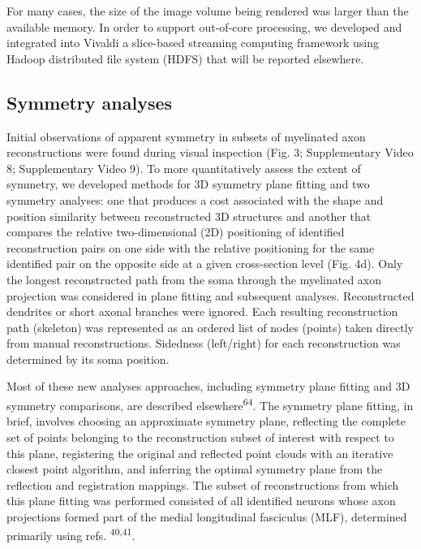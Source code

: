 \documentclass{article}
\begin{document}
For many cases, the size of the image volume being rendered was larger than the available memory. In order to support out-of-core processing, we developed and integrated into Vivaldi a slice-based streaming computing framework using Hadoop distributed file system (HDFS) that will be reported elsewhere.

\subsection*{Symmetry analyses}

Initial observations of apparent symmetry in subsets of myelinated axon reconstructions were found during visual inspection (Fig. 3; Supplementary Video 8; Supplementary Video 9). To more quantitatively assess the extent of symmetry, we developed methods for 3D symmetry plane fitting and two symmetry analyses: one that produces a cost associated with the shape and position similarity between reconstructed 3D structures and another that compares the relative two-dimensional (2D) positioning of identified reconstruction pairs on one side with the relative positioning for the same identified pair on the opposite side at a given cross-section level (Fig. 4d). Only the longest reconstructed path from the soma through the myelinated axon projection was considered in plane fitting and subsequent analyses. Reconstructed dendrites or short axonal
branches were ignored. Each resulting reconstruction path (skeleton) was represented as an ordered list of nodes (points) taken directly from manual reconstructions. Sidedness (left/right) for each reconstruction was determined by its soma position.

Most of these new analyses approaches, including symmetry plane fitting and 3D symmetry comparisons, are described elsewhere\textsuperscript{64}. The symmetry plane fitting, in brief, involves choosing an approximate symmetry plane, reflecting the complete set of points belonging to the reconstruction subset of interest with respect to this plane, registering the original and reflected point clouds with an iterative closest point algorithm, and inferring the optimal symmetry plane from the reflection and registration mappings. The subset of reconstructions from which this plane fitting was performed consisted of all identified neurons whose axon projections formed part of the medial longitudinal fasciculus (MLF), determined primarily using refs. \textsuperscript{40,41}.
\end{document}
